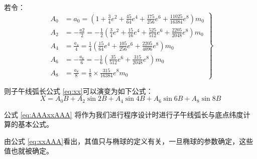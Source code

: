 \begin{enumerate}
          若令：
          \begin{equation}
              \label{eq:xxAAA}
              \left  . \begin{aligned}
                  A_0 & =a_0 = (1 + \frac{3}{4} e^2 + \frac{45}{64} e^4 + \frac{175}{256} e^6 + \frac{11025}{16384} e^8) m_0                  \\
                  A_2 & =-\frac{a2}{2} =-\frac{1}{2}  (\frac{3}{4} e^2 + \frac{15}{16} e^4 + \frac{525}{512} e^6 + \frac{2205}{2048} e^8) m_0 \\
                  A_4 & =\frac{a_4}{4}=\frac{1}{4} (\frac{15}{64} e^4 + \frac{105}{256} e^6 + \frac{2205}{4096} e^8) m_0                      \\
                  A_6 & =-\frac{a_6}{6}=-\frac{1}{6} (\frac{35}{512} e^6 + \frac{315}{2048} e^8) m_0                                          \\
                  A_8 & = \frac{a_8}{8}=\frac{1}{8} \times \frac{315}{16384} e^8 m_0
              \end{aligned} \right \}
          \end{equation}

          则子午线弧长公式 \ref{eq:xx}可以演变为如下公式：
          \begin{equation}
              \label{eq:AAAxxAAA}
              X= A_0 B + A_2 \sin 2B + A_4 \sin 4B + A_6 \sin 6B  + A_8 \sin 8B
          \end{equation}

          公式 \ref{eq:AAAxxAAA} 将作为我们进行程序设计时进行子午线弧长与底点纬度计算的基本公式。

          由公式 \ref{eq:xxAAA}看出，其值只与椭球的定义有关，一旦椭球的参数确定，这些值也就被确定。






\end{enumerate}
